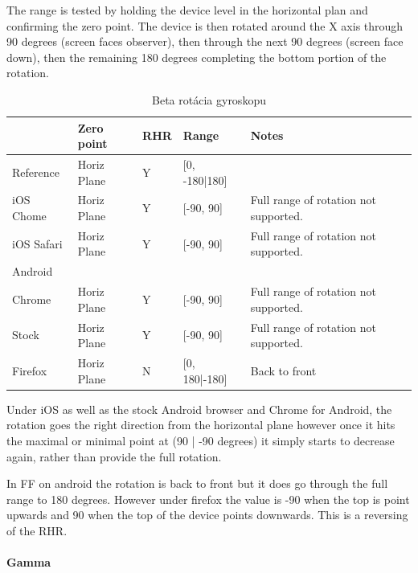 The range is tested by holding the device level in the horizontal plan and confirming the zero point. The device is then rotated around the X axis through 90 degrees (screen faces observer), then through the next 90 degrees (screen face down), then the remaining 180 degrees completing the bottom portion of the rotation.

\begin{table}[H]
  \begin{tabular}{ | l | l | l | l | l |}
  \hline
              & Zero point    & RHR   & Range         & Notes\\ \hline
  Reference   & Horiz Plane   & Y     & [0, -180|180] & \\  
  iOS Chome   & Horiz Plane   & Y     & [-90, 90]     & Full range of rotation not supported. \\  
  iOS Safari  & Horiz Plane   & Y     & [-90, 90]     & Full range of rotation not supported. \\  
  Android & & & & \\  
  Chrome      & Horiz Plane   & Y     & [-90, 90]     & Full range of rotation not supported. \\  
  Stock       & Horiz Plane   & Y     & [-90, 90]     & Full range of rotation not supported. \\  
  Firefox     & Horiz Plane   & N     & [0, 180|-180] & Back to front \\
  \hline
  \end{tabular}
  \caption[Beta rotácia gyroskopu]{Beta rotácia gyroskopu}
\end{table}

Under iOS as well as the stock Android browser and Chrome for Android, the rotation goes the right direction from the horizontal plane however once it hits the maximal or minimal point at (90 | -90 degrees) it simply starts to decrease again, rather than provide the full rotation.

In FF on android the rotation is back to front but it does go through the full range to 180 degrees. However under firefox the value is -90 when the top is point upwards and 90 when the top of the device points downwards. This is a reversing of the RHR.


\paragraph{Gamma} %
\label{par:gamma}



